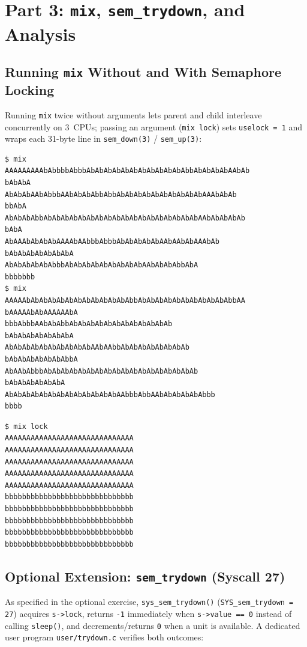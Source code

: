 \documentclass[12pt,a4paper]{article}
\begin{document}
\section{Part 3: \texttt{mix}, \texttt{sem\_trydown}, and Analysis}

\subsection{Running \texttt{mix} Without and With Semaphore Locking}
Running \texttt{mix} twice without arguments lets parent and child interleave concurrently on 3~CPUs; passing an argument (\texttt{mix lock}) sets \texttt{uselock = 1} and wraps each 31-byte line in \texttt{sem\_\allowbreak down(3)} / \texttt{sem\_\allowbreak up(3)}:

\begin{lstlisting}[style=consolestyle, caption={Observed QEMU outputs of \texttt{mix} without locking (two runs)}]
$ mix
AAAAAAAAAbAbbbbAbbbAbAbAbAbAbAbAbAbAbAbAbAbbAbAbAbAbAAbAb
bAbAbA
AbAbAbAAbAbbbAAbAbAbAbbAbbAbAbAbAbAbAbAbAbAbAbAAAbAbAb
bbAbA
AbAbAbAbbAbAbAbAbAbAbAbAbAbAbAbAbAbAbAbAbAbAbAAbAbAbAbAb
bAbA
AbAAAbAbAbAbAAAAbAAbbbAbbbAbAbAbAbAbAAbAAbAbAAAbAb
bAbAbAbAbAbAbAbA
AbAbAbAbAbAbbbAbAbAbAbAbAbAbAbAbAAbAbAbAbbAbA
bbbbbbb
$ mix
AAAAAbAbAbAbAbAbAbAbAbAbAbAbAbbAbAbAbAbAbAbAbAbAbAbAbbAA
bAAAAAbAbAAAAAAbA
bbbAbbbAAbAbAbbAbAbAbAbAbAbAbAbAbAbAbAb
bAbAbAbAbAbAbAbA
AbAbAbAbAbAbAbAbAbAbAAbAAbbAbAbAbAbAbAbAbAb
bAbAbAbAbAbAbAbbA
AbAAbAbbbAbAbAbAbAbAbAbAbAbAbAbAbAbAbAbAbAbAb
bAbAbAbAbAbAbA
AbAbAbAbAbAbAbAbAbAbAbAbAbAAbbbAbbAAbAbAbAbAbAbbb
bbbb
\end{lstlisting}

\newpage

\begin{lstlisting}[style=consolestyle, caption={Observed QEMU output of \texttt{mix lock} (semaphore 3 initialized to 1)}]
$ mix lock
AAAAAAAAAAAAAAAAAAAAAAAAAAAAAA
AAAAAAAAAAAAAAAAAAAAAAAAAAAAAA
AAAAAAAAAAAAAAAAAAAAAAAAAAAAAA
AAAAAAAAAAAAAAAAAAAAAAAAAAAAAA
AAAAAAAAAAAAAAAAAAAAAAAAAAAAAA
bbbbbbbbbbbbbbbbbbbbbbbbbbbbbb
bbbbbbbbbbbbbbbbbbbbbbbbbbbbbb
bbbbbbbbbbbbbbbbbbbbbbbbbbbbbb
bbbbbbbbbbbbbbbbbbbbbbbbbbbbbb
bbbbbbbbbbbbbbbbbbbbbbbbbbbbbb
\end{lstlisting}

\subsection{Optional Extension: \texttt{sem\_trydown} (Syscall 27)}
As specified in the optional exercise, \texttt{sys\_\allowbreak sem\_\allowbreak trydown()} (\texttt{SYS\_\allowbreak sem\_\allowbreak trydown = 27}) acquires \texttt{s->lock}, returns \texttt{-1} immediately when \texttt{s->value == 0} instead of calling \texttt{sleep()}, and decrements/returns \texttt{0} when a unit is available. A dedicated user program \texttt{user/\allowbreak trydown.c} verifies both outcomes:
\end{document}
